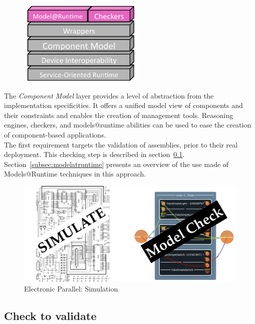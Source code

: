 \begin{figure}
  \vspace{-5mm}
  \includegraphics[width=60mm]{part2/pics/layers/MartReasoners.pdf}
  \vspace{-5mm}
\end{figure}

The {\it Component Model} layer provides a level of abstraction from the implementation specificities. It offers a unified model view of components and their constraints and enables the creation of management tools. Reasoning engines, checkers, and models@runtime abilities can be used to ease the creation of component-based applications.\\
The first requirement targets the validation of assemblies, prior to their real deployment. This checking step is described in section~\ref{subsec:check_to_validate}. Section~\ref{subsec:modelatruntime} presents an overview of the use made of Models@Runtime techniques in this approach.

\begin{figure}[h!]
	\includegraphics[width=\textwidth]{part2/pics/ModelCheck.pdf}
	\caption{Electronic Parallel: Simulation}
  	\label{fig:elecSimulation}
\end{figure}

\subsection{Check to validate}
\label{subsec:check_to_validate}


